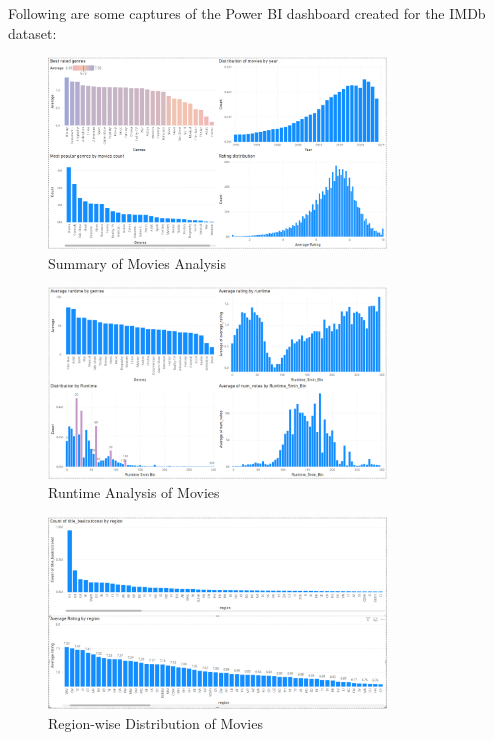 \documentclass[a4paper,12pt]{article}
\begin{document}
Following are some captures of the Power BI dashboard created for the IMDb dataset:

\begin{figure}[H]
    \centering
    \includegraphics[width=0.8\textwidth]{../assets/movies_summary.png}
    \caption{Summary of Movies Analysis}
    \label{fig:movies_summary}
\end{figure}

\begin{figure}[H]
    \centering
    \includegraphics[width=0.8\textwidth]{../assets/movies_runtime.png}
    \caption{Runtime Analysis of Movies}
    \label{fig:movies_runtime}
\end{figure}

\begin{figure}[H]
    \centering
    \includegraphics[width=0.8\textwidth]{../assets/movies_region.png}
    \caption{Region-wise Distribution of Movies}
    \label{fig:movies_region}
\end{figure}



\end{document}
